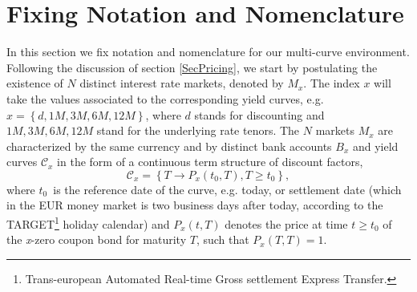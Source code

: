 \documentclass[11pt,reqno]{amsart}
\begin{document}
\section{\label{SecMath}Fixing Notation and Nomenclature}
In this section we fix notation and nomenclature for our multi-curve environment. Following the discussion of section \ref{SecPricing}, we start by postulating the existence of $N$ distinct interest rate markets, denoted by $M_{x}$. The index $x$ will take the values associated to the corresponding yield curves, e.g. $x=\left\{d,1M,3M,6M,12M\right\}$, where $d$ stands for discounting and $1M,3M,6M,12M$ stand for the underlying rate tenors. The $N$ markets $M_{x}$ are characterized by the same currency and by distinct bank accounts $B_{x}$ and yield curves $\mathcal{C}_{x}$ in the form of a continuous term structure of discount factors,
\begin{equation}
\mathcal{C}_{x}=\left\{ T\longrightarrow P_{x}\left( t_{0},T\right) ,T\geq t_{0}\right\} ,
\end{equation}
where $t_{0}$\ is the reference date of the curve, e.g. today, or settlement date (which in the EUR money market is two business days after today, according to the TARGET\footnote{Trans-european Automated Real-time Gross settlement Express Transfer.} holiday calendar) and $P_{x}\left(t,T\right)$ denotes the price at time $t\geq t_{0}$ of the \textit{x}-zero coupon bond for maturity $T$, such that $P_{x}\left( T,T\right) =1$.
\end{document}
